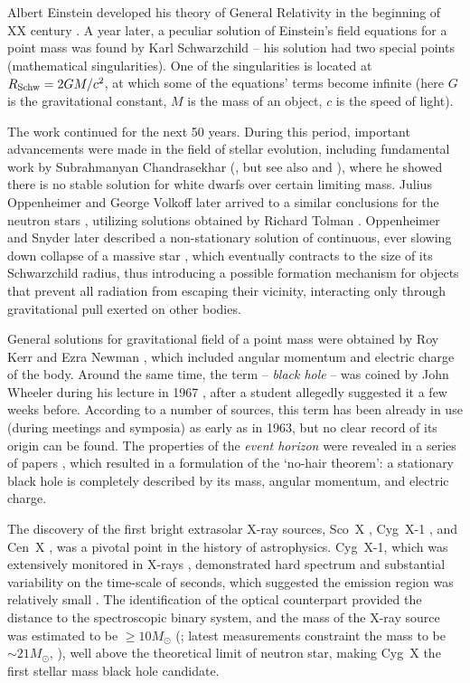 Albert Einstein developed his theory of General Relativity in the beginning of XX century \citep{Einstein1915}.
A year later, a peculiar solution of Einstein's field equations for a point mass was found by Karl Schwarzchild -- his solution had two special points (mathematical singularities).
One of the singularities is located at $R_{\mathrm{Schw}} = 2GM/c^2$, at which some of the equations' terms become infinite (here $G$ is the gravitational constant, $M$ is the mass of an object, $c$ is the speed of light).


The work continued for the next 50 years. 
During this period, important advancements were made in the field of stellar evolution, including fundamental work by Subrahmanyan Chandrasekhar (\citealt{Chandrasekhar1931a}, but see also \citealt{Stoner1930} and \citealt{Landau1932}), where he showed there is no stable solution for white dwarfs over certain limiting mass.
Julius Oppenheimer and George Volkoff later arrived to a similar conclusions for the neutron stars \citep{Oppenheimer1939}, utilizing solutions obtained by Richard Tolman \citep{Tolman1939}.
Oppenheimer and Snyder later described a non-stationary solution of continuous, ever slowing down collapse of a massive star \citep{Oppenheimer1939a}, which eventually contracts to the size of its Schwarzchild radius, thus introducing a possible formation mechanism for objects that prevent all radiation from escaping their vicinity, interacting only through gravitational pull exerted on other bodies.


General solutions for gravitational field of a point mass were obtained by Roy Kerr \citep{Kerr1963} and Ezra Newman \citep{Newman1965}, which included angular momentum and electric charge of the body.
Around the same time, the term -- \textit{black hole} -- was coined by John Wheeler during his lecture in 1967 \citep{Pounds2014}, after a student allegedly suggested it a few weeks before.
According to a number of sources, this term has been already in use (during meetings and symposia) as early as in 1963, but no clear record of its origin can be found. 
The properties of the \textit{event horizon} \citep{Finkelstein1958} were revealed in a series of papers \citep[e.g., ][]{Israel1968, Carter1971}, which resulted in a formulation of the `no-hair theorem': a stationary black hole is completely described by its mass, angular momentum, and electric charge.

The discovery of the first bright extrasolar X-ray sources, Sco~X \citep{Giacconi1962}, Cyg~X-1 \citep{Bowyer1965}, and Cen~X \citep{Chodil1967}, was a pivotal point in the history of astrophysics.
Cyg~X-1, which was extensively monitored in X-rays \citep{Overbeck1968, Schreier1971}, demonstrated hard spectrum and substantial variability on the time-scale of seconds, which suggested the emission region was relatively small \citep{Pounds2014}.
The identification of the optical counterpart provided the distance to the spectroscopic binary system, and the mass of the X-ray source was estimated to be $\ge 10 M_\odot$ (\citealt{Paczynski1974}; latest measurements constraint the mass to be $\sim 21 M_\odot$, \citealt{Miller-Jones2021}), well above the theoretical limit of neutron star, making Cyg~X the first stellar mass black hole candidate.

